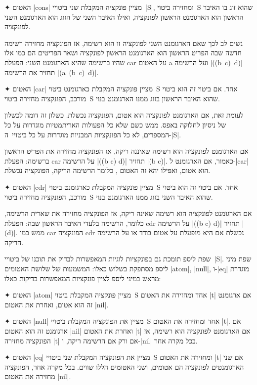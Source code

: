\begin{enumerate}
  ✦ האטום \T|cons| מציין פונקציה המקבלת שני ביטויי~\E|S|, ומחזירה ביטוי~S
  שהוא זוג בו האיבר הראשון הוא הארגומנט הראשון לפונקציה, ואילו האיבר השני של
  הזוג הוא הארגומנט השני לפונקציה.

  נשים לב לכך שאם הארגומנט השני לפונקציה זו הוא רשימה, אז הפונקציה מחזירה רשימה
  חדשה שבה הפריט הראשון הוא הארגומנט הראשון לפונקציה ושאר הפריטים הם כמו אלו
  שהיו ברשימה שהיא הארגומנט השני: הפעלת car על האטום a ועל הרשימה
  \E|((b~c)~d)| תחזיר את הרשימה \E|(a~(b~c)~d)|.

  ✦ האטום \T|car| מציין פונקציה המקבלת כארגומנט ביטוי~S אחד. אם ביטוי זה הוא
  ביטוי מורכב, הפונקציה מחזירה ביטוי~S שהוא האיבר הראשון בזוג ממנו הארגומנט
  בנוי.

  לעומת זאת, אם הארגומנט לפונקציה הוא אטום, הפונקציה נכשלת. כשלון זה דומה
  לכשלון של ניסיון לחלוקה באפס. ממש כשם שלא כל הפעולות האריתמטיות מוגדרות על כל
  המספרים, לא כל הפונקציות המבניות מוגדרות על כל ביטויי~ה-\E|S|.

  אם הארגומנט לפונקציה הוא רשימה שאיננה ריקה, אז הפונקציה מחזירה את הפריט
  הראשון ברשימה: הפעלת car על הרשימה \E|((b c) d)| תחזיר \E|(b c)|. כאמור, אם
  הארגומנט ל-\E|car| הוא אטום, ואפילו יהא זה האטום , כלומר הרשימה
  הריקה, הפונקציה נכשלת.

  ✦ האטום \T|cdr| מציין פונקציה המקבלת כארגומנט ביטוי~S אחד. אם ביטוי זה הוא
  ביטוי מורכב, הפונקציה מחזירה ביטוי~S שהוא האיבר השני בזוג ממנו הארגומנט בנוי.

  אם הארגומנט לפונקציה הוא רשימה שאינה ריקה, אז הפונקציה מחזירה את שארית
  הרשימה, כלומר, הרשימה בלעדי האיבר הראשון שבה: הפעלת cdr על הרשימה \E|((b c)
  d)| תחזיר \E|(d)|. ממש כמו car הפונקציה cdr נכשלת אם היא מופעלת על אטום בודד
  או על הרשימה הריקה.

\end{enumerate}

שפת ליספ תומכת גם בפונקציות לוגיות המאפשרות לבדוק את תוכנו של ביטויי~\E|S|.
שפת מיני ליספ מסתפקת בשלוש כאלו: המשמעות של שלושת האטומים \T|atom|, \T|null|,
ו-\T|eq| מוגדרת מראש במיני ליספ לציין פונקציות המאפשרות בדיקות כאלו:

\begin{enumerate}
  ✦ האטום \T|atom| מציין פונקציה המקבלת ביטוי~S אחד ומחזירה את האטום \T|t| אם
  ארגומנט זה הוא אטום, ואחרת את האטום \T|nil|.

  ✦ האטום \T|null| מציין את הפונקציה המקבלת ביטויי~S אחד ומחזירה את האטום
  \T|t|. אם ארגומנט זה הוא האטום \T|nil| ואחרת את האטום \T|t| אם הארגומנט
  לפונקציה הוא רשימה, אז הפונקציה מחזירה \T|t| אם ורק אם הרשימה ריקה, ו-\T|nil|
  בכל מקרה אחר.

  ✦ האטום \T|eq| מציין את הפונקציה המקבלת שני ביטויי~S ומחזירה את האטום \T|t|
  אם שני הארגומנטים לפונקציה הם אטומים, ושני האטומים הללו שווים. בכל מקרה אחר,
  הפונקציה מחזירה את האטום \T|nil|.
\end{enumerate}

